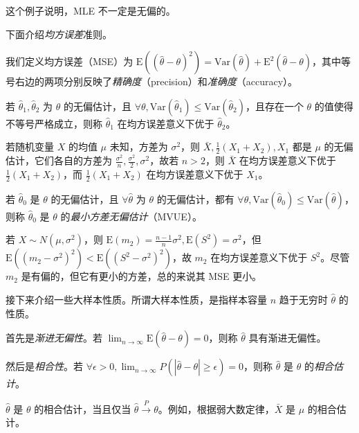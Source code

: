 \documentclass[../main.tex]{subfiles}
\begin{document}
这个例子说明，MLE 不一定是无偏的。

下面介绍\emph{均方误差}准则。

我们定义均方误差（MSE）为 $\mathrm E((\hat\theta-\theta)^2)=\mathrm{Var}(\hat\theta)+\mathrm E^2(\hat\theta-\theta)$，其中等号右边的两项分别反映了\emph{精确度}（precision）和\emph{准确度}（accuracy）。

\begin{definition}\label{def:6.3.2}
    若 $\hat\theta_1,\hat\theta_2$ 为 $\theta$ 的无偏估计，且 $\forall\theta,\mathrm{Var}(\hat\theta_1)\leq\mathrm{Var}(\hat\theta_2)$，且存在一个 $\theta$ 的值使得不等号严格成立，则称 $\hat\theta_1$ 在均方误差意义下优于 $\hat\theta_2$。
\end{definition}

\begin{example}
    若随机变量 $X$ 的均值 $\mu$ 未知，方差为 $\sigma^2$，则 $\bar X,\frac12(X_1+X_2),X_1$ 都是 $\mu$ 的无偏估计，它们各自的方差为 $\frac{\sigma^2}n,\frac{\sigma^2}2,\sigma^2$，故若 $n>2$，则 $\bar X$ 在均方误差意义下优于 $\frac12(X_1+X_2)$，而 $\frac12(X_1+X_2)$ 在均方误差意义下优于 $X_1$。
\end{example}

\begin{definition}\label{def:6.3.3}
    若 $\hat\theta_0$ 是 $\theta$ 的无偏估计，且 $\forall\hat\theta$ 为 $\theta$ 的无偏估计，都有 $\forall\theta,\mathrm{Var}(\hat\theta_0)\leq\mathrm{Var}(\hat\theta)$，则称 $\hat\theta_0$ 是 $\theta$ 的\emph{最小方差无偏估计}（MVUE）。
\end{definition}

\begin{example}
    若 $X\sim N(\mu,\sigma^2)$，则 $\mathrm E(m_2)=\frac{n-1}n\sigma^2,\mathrm E(S^2)=\sigma^2$，但 $\mathrm E((m_2-\sigma^2)^2)<\mathrm E((S^2-\sigma^2)^2)$，故 $m_2$ 在均方误差意义下优于 $S^2$。尽管 $m_2$ 是有偏的，但它有更小的方差，总的来说其 MSE 更小。
\end{example}

接下来介绍一些大样本性质。所谓大样本性质，是指样本容量 $n$ 趋于无穷时 $\hat\theta$ 的性质。

首先是\emph{渐进无偏性}。若 $\lim_{n\rightarrow\infty}\mathrm E(\hat\theta-\theta)=0$，则称 $\hat\theta$ 具有渐进无偏性。

然后是\emph{相合性}。若 $\forall\epsilon>0,\lim_{n\rightarrow\infty}P(|\hat\theta-\theta|\geq\epsilon)=0$，则称 $\hat\theta$ 是 $\theta$ 的\emph{相合估计}。

$\hat\theta$ 是 $\theta$ 的相合估计，当且仅当 $\hat\theta\overset{P}{\rightarrow}\theta$。例如，根据弱大数定律，$\bar X$ 是 $\mu$ 的相合估计。
\end{document}
